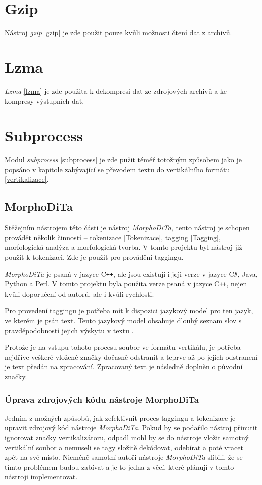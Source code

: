 \section{Gzip}
Nástroj \textit{gzip} \ref{gzip} je zde použit pouze kvůli možnosti čtení dat z archivů.

\section{Lzma}
\textit{Lzma} \ref{lzma} je zde použita k dekompresi dat ze zdrojových archivů a ke kompresy výstupních dat.

\section{Subprocess}
Modul \textit{subprocess} \ref{subprocess} je zde pužit téměř totožným způsobem jako je popsáno v kapitole zabývající
se převodem textu do vertikálního formátu \ref{vertikalizace}.

\subsection{MorphoDiTa}
\label{morphodita}
Stěžejním nástrojem této části je nástroj \textit{MorphoDiTa}, tento nástroj je schopen provádět
několik činností -- tokenizace \ref{Tokenizace}, tagging \ref{Tagging}, morfologická analýza a morfologická tvorba. V tomto projektu
byl nástroj již použit k tokenizaci. Zde je použit pro provádění taggingu.

\textit{MorphoDiTa} je psaná v jazyce C\texttt{++}, ale jsou existují i jeji verze v jazyce C\texttt{\#}, Java,
Python a Perl. V tomto projektu byla použita verze psaná v jazyce C\texttt{++}, nejen kvůli doporučení od autorů, ale
i kvůli rychlosti.

Pro provedení taggingu je potřeba mít k dispozici jazykový model pro ten jazyk, ve kterém je psán text. Tento jazykový model obsahuje
dlouhý seznam slov s pravděpodobností jejich výskytu v textu \cite{LANGMODEL}.

Protože je na vstupu tohoto procesu soubor ve formátu vertikálu, je potřeba nejdříve veškeré vložené značky dočasně odstranit a teprve
až po jejich odstranení je text předán na zpracování. Zpracovaný text je následně doplněn o původní značky.

\subsubsection{Úprava zdrojových kódu nástroje MorphoDiTa}
Jedním z možných způsobů, jak zefektivnit proces taggingu a tokenizace je upravit zdrojový kód
nástroje \textit{MorphoDiTa}. Pokud by se podařilo nástroj přinutit ignorovat značky vertikalizátoru,
odpadl mohl by se do nástroje vložit samotný vertikální soubor a nemuseli se tagy složitě dekódovat,
odebírat a poté vracet zpět na své místo. Nicméně samotní autoři nástroje \textit{MorphoDiTa} slíbili,
že se tímto problémem budou zabívat a je to jedna z věcí, které plánují v tomto nástroji
implementovat.

